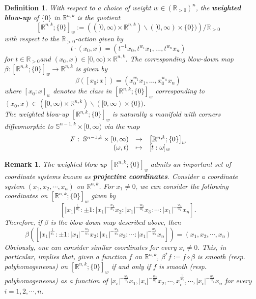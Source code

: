 \documentclass[a4paper,11pt]{article}
\newcounter{mythm}[section]
\newtheorem{defi}[mythm]{Definition}
\newtheorem{rem}[mythm]{Remark}
\def\R{\mathbb{R}}
\begin{document}
\begin{defi} \label{weighted blow-up}
With respect to a choice of weight $w \in\left(\mathbb{R}_{>0}\right)^n$, the \textbf{weighted blow-up} of $\{0\}$ in $\mathbb{R}^{n,k}$ is the quotient
$$
\left[\mathbb{R}^{n,k} ;\{0\}\right]_w:=\left(\left([0, \infty) \times \mathbb{R}^{n,k}\right) \backslash([0, \infty) \times\{0\})\right) / \mathbb{R}_{>0}
$$
with respect to the $\mathbb{R}_{>0}$-action given by
$$
t \cdot\left(x_0, x\right)=\left(t^{-1} x_0, t^{w_1} x_1, \ldots, t^{w_n} x_n\right)
$$
for $t \in \mathbb{R}_{>0}$and $\left(x_0, x\right) \in[0, \infty) \times \mathbb{R}^{n,k}$. The corresponding blow-down map $\beta:\left[\mathbb{R}^{n,k} ;\{0\}\right]_w \rightarrow \mathbb{R}^{n,k}$ is given by
$$
\beta\left(\left[x_0: x\right]\right)=\left(x_0^{w_1} x_1, \ldots, x_0^{w_n} x_n\right)
$$
where $\left[x_0: x\right]_w$ denotes the class in $\left[\mathbb{R}^{n,k} ;\{0\}\right]_w$ corresponding to $\left(x_0, x\right) \in\left([0, \infty) \times \mathbb{R}^{n,k}\right) \backslash([0, \infty) \times\{0\})$.\\

The weighted blow-up $\left[\mathbb{R}^{n,k} ;\{0\}\right]_w$ is naturally a manifold with corners diffeomorphic to $\mathbb{S}^{n-1,k} \times[0, \infty)$ via the map
$$
\begin{array}{rllc}
F: \hspace{0.1cm} \mathbb{S}^{n-1,k} \times[0, \infty) & \rightarrow & {\left[\mathbb{R}^{n,k} ;\{0\}\right]_w} \\
(\omega, t) & \mapsto & {[t: \omega]_w}
\end{array}
$$
\end{defi}
\begin{rem} \label{projective coordinates}
    The weighted blow-up $\left[\mathbb{R}^{n,k} ; \{0\}\right]_w$ admits an important set of coordinate systems known as \textbf{projective coordinates}. Consider a coordinate system $(x_1, x_2, \cdots, x_n)$ on $\R^{n,k}$. For $x_1 \neq 0$, we can consider the following coordinates on $\left[\mathbb{R}^{n,k} ; \{0\}\right]_w$ given by $$\left[|x_1|^{\frac{1}{w_1}} : \pm 1 : |x_1|^{- \frac{w_2}{w_1}} x_2 : |x_1|^{- \frac{w_3}{w_1}} x_3 : \cdots : |x_1|^{- \frac{w_n}{w_1}} x_n \right].$$
    Therefore, if $\beta$ is the blow-down map described above, then $$\beta \left( \left[|x_1|^{\frac{1}{w_1}} : \pm 1 : |x_1|^{- \frac{w_2}{w_1}} x_2 : |x_1|^{- \frac{w_3}{w_1}} x_3 : \cdots : |x_1|^{- \frac{w_n}{w_1}} x_n \right] \right) = (x_1, x_2, \cdots, x_n)$$ 
    Obviously, one can consider similar coordinates for every $x_i \neq 0$. This, in particular, implies that, given a function $f$ on $\R^{n,k}$, $\beta^*f:= f \circ \beta$ is smooth (resp. polyhomogeneous) on $\left[\mathbb{R}^{n,k} ; \{0\}\right]_w$ if and only if $f$ is smooth (resp. polyhomogeneous) as a function of $|x_i|^{- \frac{w_1}{w_i}} x_1, |x_i|^{- \frac{w_2}{w_i}} x_2, \cdots, x_i^{\frac{1}{w_i}}, \cdots, |x_i|^{- \frac{w_n}{w_i}} x_n$ for every $i =1,2, \cdots, n$.
\end{rem}
\end{document}
